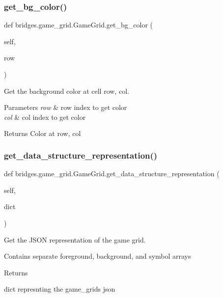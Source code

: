 \subsubsection{\texorpdfstring{get\+\_\+bg\+\_\+color()}{get\_bg\_color()}}
{\footnotesize\ttfamily def bridges.\+game\+\_\+grid.\+Game\+Grid.\+get\+\_\+bg\+\_\+color (\begin{DoxyParamCaption}\item[{}]{self,  }\item[{}]{row }\end{DoxyParamCaption})}



Get the background color at cell row, col. 


\begin{DoxyParams}{Parameters}
{\em row} & row index to get color \\
\hline
{\em col} & col index to get color \\
\hline
\end{DoxyParams}
\begin{DoxyReturn}{Returns}
Color at row, col 
\end{DoxyReturn}
\mbox{\label{classbridges_1_1game__grid_1_1_game_grid_acb17afe074d5222b418e922ed5f48ed7}} 
\subsubsection{\texorpdfstring{get\+\_\+data\+\_\+structure\+\_\+representation()}{get\_data\_structure\_representation()}}
{\footnotesize\ttfamily def bridges.\+game\+\_\+grid.\+Game\+Grid.\+get\+\_\+data\+\_\+structure\+\_\+representation (\begin{DoxyParamCaption}\item[{}]{self,  }\item[{}]{dict }\end{DoxyParamCaption})}



Get the J\+S\+ON representation of the game grid. 

Contains separate foreground, background, and symbol arrays \begin{DoxyReturn}{Returns}


dict represnting the game\+\_\+grids json 
\end{DoxyReturn}
\mbox{\label{classbridges_1_1game__grid_1_1_game_grid_a0a38f422a54e93cfd2816e0051fb8d5a}} 
